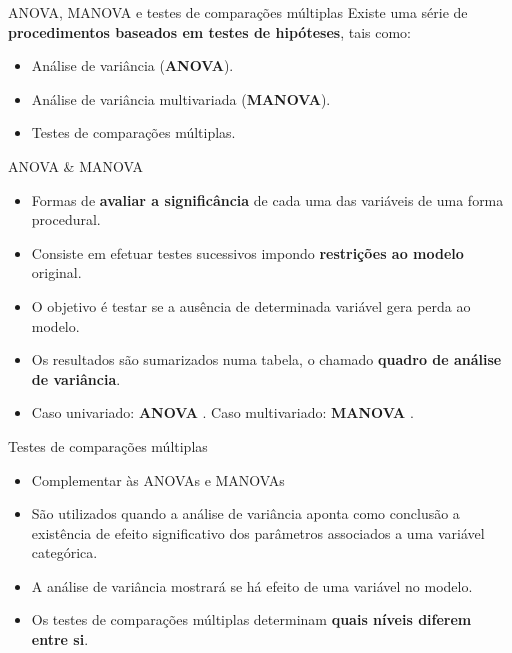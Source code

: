 \documentclass[
  ignorenonframetext,
  serif,
  professionalfont,
  usenames,
  dvipsnames,
  aspectratio = 169]{beamer}
\begin{document}
\begin{frame}{ANOVA, MANOVA e testes de comparações múltiplas}
\protect\hypertarget{anova-manova-e-testes-de-comparauxe7uxf5es-muxfaltiplas}{}
Existe uma série de
\textbf{procedimentos baseados em testes de hipóteses}, tais como:

\begin{itemize}

  \itemsep 2ex
  
  \item Análise de variância (\textbf{ANOVA}).
  \item Análise de variância multivariada (\textbf{MANOVA}).
  \item Testes de comparações múltiplas.

\end{itemize}
\end{frame}

\begin{frame}{ANOVA \& MANOVA}
\protect\hypertarget{anova-manova}{}
\begin{itemize}
    \itemsep 2ex

  \item Formas de \textbf{avaliar a significância} de cada uma das variáveis de uma forma procedural.  
  
  \item Consiste em efetuar testes sucessivos impondo \textbf{restrições ao modelo} original. 

  \item O objetivo é testar se a ausência de determinada variável gera perda ao modelo. 

  \item Os resultados são sumarizados numa tabela, o chamado \textbf{quadro de análise de variância}.

  \item Caso univariado: \textbf{ANOVA} \citep{anova_fisher}. Caso multivariado: \textbf{MANOVA} \citep{manova}.
  
  \end{itemize}
\end{frame}

\begin{frame}{Testes de comparações múltiplas}
\protect\hypertarget{testes-de-comparauxe7uxf5es-muxfaltiplas}{}
\begin{itemize}
  \itemsep 2ex
    
  \item Complementar às ANOVAs e MANOVAs

  \item São utilizados quando a análise de variância aponta como conclusão a existência de efeito significativo dos parâmetros associados a uma variável categórica.

  \item A análise de variância mostrará se há efeito de uma variável no modelo.
 
  \item Os testes de comparações múltiplas determinam \textbf{quais níveis diferem entre si}. 

\end{itemize}
\end{frame}
\end{document}
